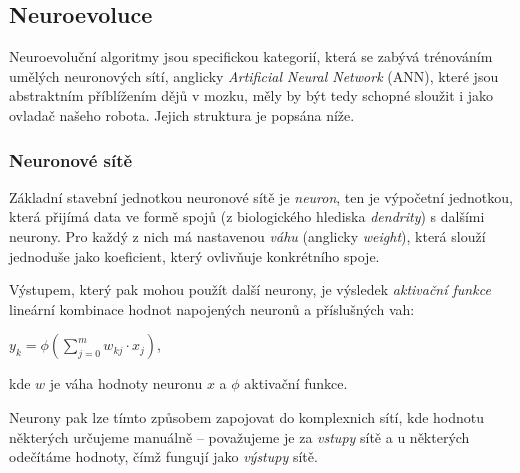 \documentclass[a4]{article}
\begin{document}
\subsection{Neuroevoluce}
Neuroevoluční algoritmy jsou specifickou kategorií, která se zabývá trénováním umělých neuronových sítí, anglicky \emph{Artificial Neural Network} (ANN), které jsou abstraktním příblížením dějů v mozku, měly by být tedy schopné sloužit i jako ovladač našeho robota. Jejich struktura je popsána níže.
\subsubsection{Neuronové sítě}
Základní stavební jednotkou neuronové sítě je \emph{neuron}, ten je výpočetní jednotkou, která přijímá data ve formě spojů (z biologického hlediska \emph{dendrity}) s dalšími neurony. Pro každý z nich má nastavenou \emph{váhu} (anglicky \emph{weight}), která slouží jednoduše jako koeficient, který ovlivňuje  konkrétního spoje.\par
Výstupem, který pak mohou použít další neurony, je výsledek \emph{aktivační funkce} lineární kombinace hodnot napojených neuronů a příslušných vah\cite{neuron}:
\begin{center}$y_k=\phi(\sum_{j=0}^m w_{kj}\cdot x_j)$,\end{center}
kde $w$ je váha hodnoty neuronu $x$ a $\phi$ aktivační funkce.\par
Neurony pak lze tímto způsobem zapojovat do komplexnich sítí, kde hodnotu některých určujeme manuálně -- považujeme je za \emph{vstupy} sítě a u některých odečítáme hodnoty, čímž fungují jako \emph{výstupy} sítě.
\end{document}
